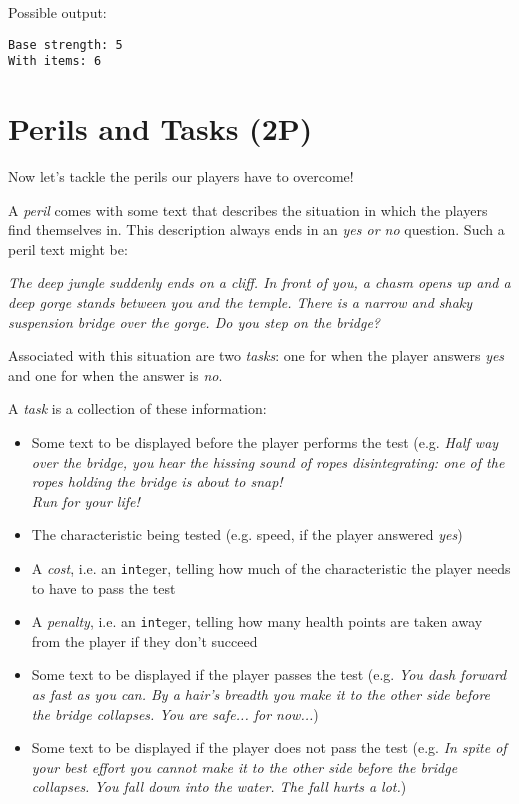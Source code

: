 \documentclass[
	english,
	fontsize=10pt,
	parskip=half,
	titlepage=true,
	DIV=12
]{scrartcl}
\newcommand*{\inPy}[1]{\texttt{#1}}
\newcommand*{\ie}{i.\;e. }
\newcommand*{\eg}{e.\;g. }
\begin{document}
Possible output:
\begin{verbatim}
Base strength: 5
With items: 6
\end{verbatim}


\section{Perils and Tasks (2\;P)}
Now let's tackle the perils our players have to overcome!

A \emph{peril} comes with some text that describes the situation in which the players find themselves in. This description always ends in an \emph{yes or no} question. Such a peril text might be:
\begin{center}
	\emph{The deep jungle suddenly ends on a cliff. In front of you, a chasm opens up and a deep gorge stands between you and the temple.
			There is a narrow and shaky suspension bridge over the gorge.
         	Do you step on the bridge?}
\end{center}

Associated with this situation are two \emph{tasks}: one for when the player answers \emph{yes} and one for when the answer is \emph{no}.

A \emph{task} is a collection of these information:
\begin{itemize}
\item Some text to be displayed before the player performs the test (\eg \emph{Half way over the bridge, you hear the hissing sound of ropes disintegrating: one of the ropes holding the bridge is about to snap!\\ Run for your life!}
\item The characteristic being tested (\eg speed, if the player answered \emph{yes})
\item A \emph{cost}, \ie an \inPy{int}eger, telling how much of the characteristic the player needs to have to pass the test
\item A \emph{penalty}, \ie an \inPy{int}eger, telling how many health points are taken away from the player if they don't succeed
\item Some text to be displayed if the player passes the test (\eg \emph{You dash forward as fast as you can. By a hair's breadth you make it to the other side before the bridge collapses. You are safe... for now...})
\item Some text to be displayed if the player does not pass the test (\eg \emph{In spite of your best effort you cannot make it to the other side before the bridge collapses. You fall down into the water. The fall hurts a lot.})
\end{itemize}
\end{document}
